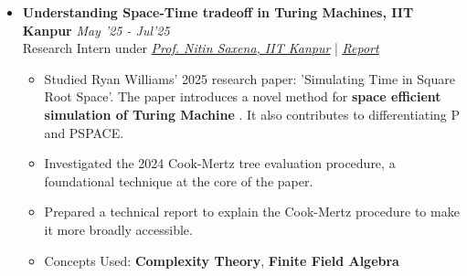 \documentclass[a4paper,10pt]{article}
\newcommand{\isep}{-2 pt}
\begin{document}
\begin{itemize}
    \item \textbf{Understanding Space-Time tradeoff in Turing Machines, IIT Kanpur}  \hfill \emph{May '25 - Jul'25}\\Research Intern under \emph{ \href{https://www.cse.iitk.ac.in/users/nitin/}{Prof. Nitin Saxena, IIT Kanpur}} |  \href{https://iitgnacin-my.sharepoint.com/:b:/g/personal/23110347_iitgn_ac_in/EUDxPGSqBT1Jiy_3R92cFYwBOvlVDrSU80oEuXmm3QzOLg?e=hibLeX} {\emph{\underline{Report}}}\\[-0.6cm]
    \begin{itemize}\itemsep \isep
        \item Studied Ryan Williams' 2025 research paper: 'Simulating Time in Square Root Space'. The paper introduces a novel method for \textbf{space efficient simulation of Turing Machine }. It also contributes to differentiating P and PSPACE.
        \item Investigated the 2024 Cook-Mertz tree evaluation procedure, a foundational technique at the core of the paper.
        \item Prepared a technical report to explain the Cook-Mertz procedure to make it more broadly accessible.
        \item Concepts Used: \textbf{Complexity Theory}, \textbf{Finite Field Algebra}
    \end{itemize}
    
    
    

\end{itemize}
\end{document}
